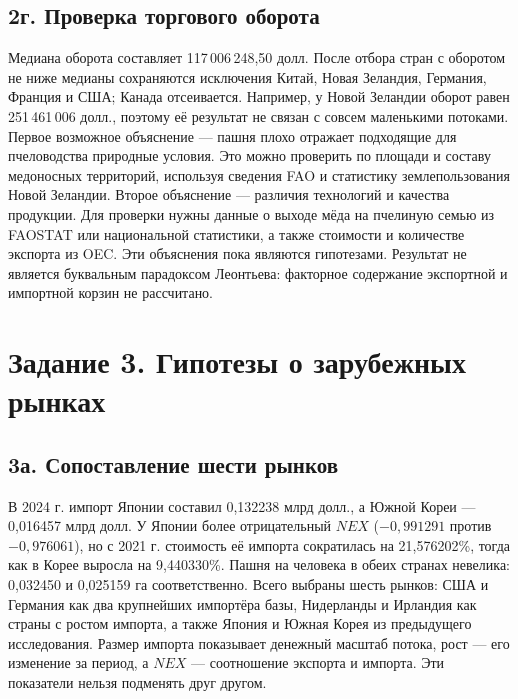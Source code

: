 \documentclass[11pt,a4paper]{article}
\begin{document}
\subsection*{2г. Проверка торгового оборота}
Медиана оборота составляет 117\,006\,248,50 долл. После отбора стран с оборотом не ниже медианы сохраняются исключения Китай, Новая Зеландия, Германия, Франция и США; Канада отсеивается. Например, у Новой Зеландии оборот равен 251\,461\,006 долл., поэтому её результат не связан с совсем маленькими потоками. Первое возможное объяснение --- пашня плохо отражает подходящие для пчеловодства природные условия. Это можно проверить по площади и составу медоносных территорий, используя сведения FAO и статистику землепользования Новой Зеландии. Второе объяснение --- различия технологий и качества продукции. Для проверки нужны данные о выходе мёда на пчелиную семью из FAOSTAT или национальной статистики, а также стоимости и количестве экспорта из OEC. Эти объяснения пока являются гипотезами. Результат не является буквальным парадоксом Леонтьева: факторное содержание экспортной и импортной корзин не рассчитано.

\section*{Задание 3. Гипотезы о зарубежных рынках}

\subsection*{3а. Сопоставление шести рынков}
В 2024 г. импорт Японии составил 0,132238 млрд долл., а Южной Кореи --- 0,016457 млрд долл. У Японии более отрицательный $NEX$ ($-0{,}991291$ против $-0{,}976061$), но с 2021 г. стоимость её импорта сократилась на 21,576202\%, тогда как в Корее выросла на 9,440330\%. Пашня на человека в обеих странах невелика: 0,032450 и 0,025159 га соответственно. Всего выбраны шесть рынков: США и Германия как два крупнейших импортёра базы, Нидерланды и Ирландия как страны с ростом импорта, а также Япония и Южная Корея из предыдущего исследования. Размер импорта показывает денежный масштаб потока, рост --- его изменение за период, а $NEX$ --- соотношение экспорта и импорта. Эти показатели нельзя подменять друг другом.
\end{document}
